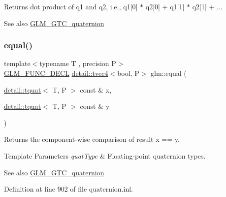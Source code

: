 Returns dot product of q1 and q2, i.\+e., q1\mbox{[}0\mbox{]} $\ast$ q2\mbox{[}0\mbox{]} + q1\mbox{[}1\mbox{]} $\ast$ q2\mbox{[}1\mbox{]} + ...

\begin{DoxySeeAlso}{See also}
\hyperlink{group__gtc__quaternion}{G\+L\+M\+\_\+\+G\+T\+C\+\_\+quaternion} 
\end{DoxySeeAlso}
\mbox{\label{group__gtc__quaternion_ga32ff2cc6fb576639a6237d8d8ed5818b}} 
\subsubsection{\texorpdfstring{equal()}{equal()}}
{\footnotesize\ttfamily template$<$typename T , precision P$>$ \\
\hyperlink{setup_8hpp_ab2d052de21a70539923e9bcbf6e83a51}{G\+L\+M\+\_\+\+F\+U\+N\+C\+\_\+\+D\+E\+CL} \hyperlink{structglm_1_1detail_1_1tvec4}{detail\+::tvec4}$<$bool, P$>$ glm\+::equal (\begin{DoxyParamCaption}\item[{\hyperlink{structglm_1_1detail_1_1tquat}{detail\+::tquat}$<$ T, P $>$ const \&}]{x,  }\item[{\hyperlink{structglm_1_1detail_1_1tquat}{detail\+::tquat}$<$ T, P $>$ const \&}]{y }\end{DoxyParamCaption})}

Returns the component-\/wise comparison of result x == y.


\begin{DoxyTemplParams}{Template Parameters}
{\em quat\+Type} & Floating-\/point quaternion types.\\
\hline
\end{DoxyTemplParams}
\begin{DoxySeeAlso}{See also}
\hyperlink{group__gtc__quaternion}{G\+L\+M\+\_\+\+G\+T\+C\+\_\+quaternion} 
\end{DoxySeeAlso}


Definition at line 902 of file quaternion.\+inl.

\mbox{\label{group__gtc__quaternion_gade4034f49ccadf63cb31a7fb5fa3c8aa}} 
